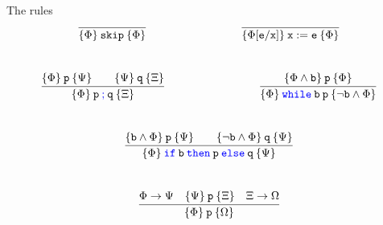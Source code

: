 \documentclass[aspectratio=169]{beamer}
\begin{document}
\newcommand{\blue}[1]{\textcolor{blue}{#1}}
\begin{frame}{The rules}
        \[
                \infer{\{ \Phi \} \> \prog{skip} \> \{ \Phi \} }{}
                \hspace{3cm}
                \infer{\{ \Phi[\prog{e}/\prog{x}] \} \> \prog{ x : = e } \>
                \{ \Phi \} }{}
        \]
        \\[1pt]
        \[
                \infer { \{ \Phi \} \> \prog{p \> \blue{ ;} \> q} \> \{ \Xi \} }{
                        \{ \Phi \} \> \prog{p} \> \{ \Psi \}
                        \qquad
                        \{ \Psi \} \> \prog{q} \> \{ \Xi \}
                }
                \hspace{3cm}
                \infer{
                        \{ \Phi \} \> \prog{\blue{while}} \> \prog{b} \>
                        \prog{p} \> 
                        \{ \neg \prog{b} \wedge \Phi \}
                }{
                        \{ \Phi \wedge \prog{b} \} \> \prog{p} \> \{ \Phi \}
                }
        \]
        \\[1pt]
        \[
                \infer {
                        \{ \Phi \} \> \prog{\blue{if} \> b}
                        \> \prog{\blue{then}} \>
                        \prog{p} \> \prog{\blue{else}} \> \prog{q}
                        \> \{ \Psi \}
                }{
                        \{ \prog{b} \wedge \Phi \} \> \prog{p} \> \{ \Psi \}
                        \qquad
                        \{ \prog{\neg b} \wedge \Phi \} \> \prog{q} \> \{ \Psi \}
                }
        \]
        \\[1pt]
        \[
                \infer{ \{ \Phi \} \> \prog{p} \> \{ \Omega \} }{
                         \Phi \rightarrow \Psi
                        \quad
                        \{ \Psi \} \> \prog{p} \> \{ \Xi \}
                        \quad
                        \Xi \rightarrow \Omega
                }
        \]
\end{frame}
\end{document}
